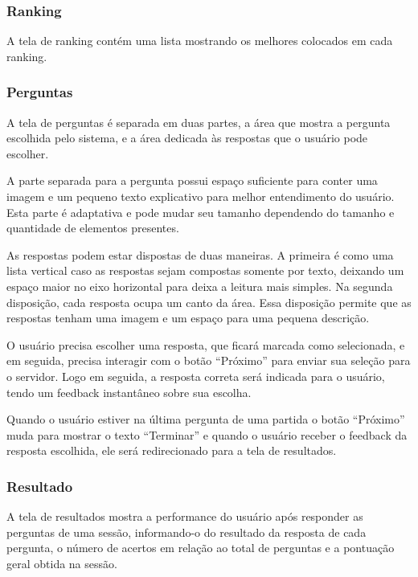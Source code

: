 \subsubsection{Ranking}
\label{subsubsec:rankingunity}

A tela de ranking contém uma lista mostrando os melhores colocados em cada ranking.


\subsubsection{Perguntas}
\label{subsubsec:perguntasunity}

A tela de perguntas é separada em duas partes, a área que mostra a pergunta escolhida pelo sistema, e a área dedicada às respostas que o usuário pode escolher.

A parte separada para a pergunta possui espaço suficiente para conter uma imagem e um pequeno texto explicativo para melhor entendimento do usuário. Esta parte é adaptativa e pode mudar seu tamanho dependendo do tamanho e quantidade de elementos presentes.

As respostas podem estar dispostas de duas maneiras. A primeira é como uma lista vertical caso as respostas sejam compostas somente por texto, deixando um espaço maior no eixo horizontal para deixa a leitura mais simples. Na segunda disposição, cada resposta ocupa um canto da área. Essa disposição permite que as respostas tenham uma imagem e um espaço para uma pequena descrição.

O usuário precisa escolher uma resposta, que ficará marcada como selecionada, e em seguida, precisa interagir com o botão “Próximo” para enviar sua seleção para o servidor. Logo em seguida, a resposta correta será indicada para o usuário, tendo um feedback instantâneo sobre sua escolha.

Quando o usuário estiver na última pergunta de uma partida o botão “Próximo” muda para mostrar o texto “Terminar” e quando o usuário receber o feedback da resposta escolhida, ele será redirecionado para a tela de resultados.


\subsubsection{Resultado}
\label{subsubsec:resultado}

A tela de resultados mostra a performance do usuário após responder as perguntas de uma sessão, informando-o do resultado da resposta de cada pergunta, o número de acertos em relação ao total de perguntas e a pontuação geral obtida na sessão.



